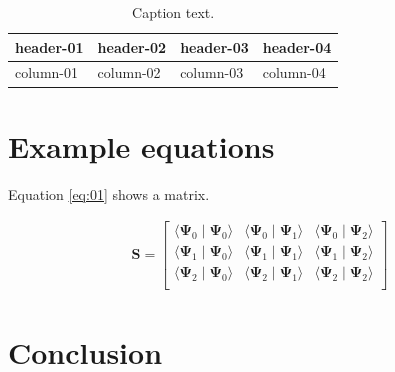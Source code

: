 \begin{table}[htbp]
\centering
    \caption{Caption text.}\label{tab:01}
    \begin{tabular}{llll}
        \toprule
        header-01 & header-02 & header-03 & header-04 \\
        \midrule
        column-01 & column-02 & column-03 & column-04 \\
    	\bottomrule
    \end{tabular}
\end{table}

\section{Example equations}
Equation \eqref{eq:01} shows a matrix.

\begin{align}
\bm{S} = \begin{bmatrix}
    \langle \bm{\Psi}_0 \mid \bm{\Psi}_0 \rangle &  \langle \bm{\Psi}_0 \mid \bm{\Psi}_1 \rangle &  \langle \bm{\Psi}_0 \mid \bm{\Psi}_2 \rangle \\
    \langle \bm{\Psi}_1 \mid \bm{\Psi}_0 \rangle &  \langle \bm{\Psi}_1 \mid \bm{\Psi}_1 \rangle &  \langle \bm{\Psi}_1 \mid \bm{\Psi}_2 \rangle \\
    \langle \bm{\Psi}_2 \mid \bm{\Psi}_0 \rangle &  \langle \bm{\Psi}_2 \mid \bm{\Psi}_1 \rangle &  \langle \bm{\Psi}_2 \mid \bm{\Psi}_2 \rangle \\
\end{bmatrix}\label{eq:01}
\end{align}

\section{Conclusion}
\blindtext